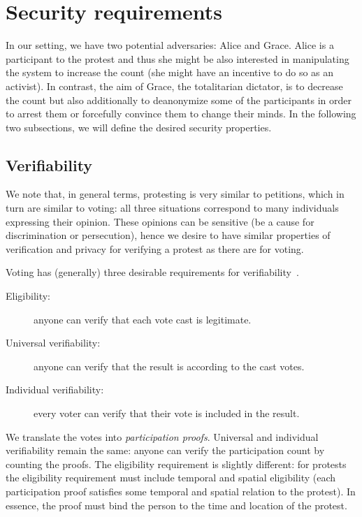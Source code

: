 \section{Security requirements}%
\label{Properties}


In our setting, we have two potential adversaries: Alice and Grace.
Alice is a participant to the protest and thus she might be also interested in manipulating the system to increase the count (\eg she might have an incentive to do so as an activist).
In contrast, the aim of Grace, the totalitarian dictator, is to decrease the 
count but also additionally to deanonymize some of the participants in order to 
arrest them or forcefully convince them to change their minds.
In the following two subsections, we will define the desired security 
properties.

\subsection{Verifiability}%
\label{Verifiability}

We note that, in general terms, protesting is very similar to petitions, which 
in turn are similar to voting: all three situations correspond to many 
individuals expressing their opinion.
These opinions can be sensitive (\eg be a cause for discrimination or 
persecution), hence we desire to have similar properties of verification and 
privacy for verifying a protest as there are for voting.

Voting has (generally) three desirable requirements for verifiability~\cite{VerifyingPrivacyPropertiesOfVotingProtocols}.
\begin{description}
  \item[Eligibility:] anyone can verify that each vote cast is legitimate.
  \item[Universal verifiability:] anyone can verify that the result is according 
    to the cast votes.
  \item[Individual verifiability:] every voter can verify that their vote is 
    included in the result.
\end{description}
We translate the votes into \emph{participation proofs}.
Universal and individual verifiability remain the same: anyone can verify the participation count by counting the proofs.
The eligibility requirement is slightly different: for protests the eligibility 
requirement must include temporal and spatial eligibility (\ie each 
participation proof satisfies some temporal and spatial relation to the 
protest).
In essence, the proof must bind the person to the time and location of the protest.

